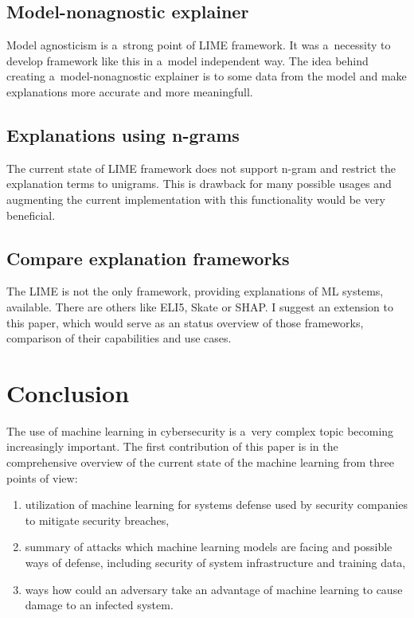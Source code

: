 \subsection{Model-nonagnostic explainer}\label{subsec:model-nonagnostic-explainer}

Model agnosticism is a~strong point of LIME framework.
It was a~necessity to develop framework like this in a~model independent way.
The idea behind creating a~model-nonagnostic explainer is to  some data from the model and make explanations more accurate and more meaningfull.

\subsection{Explanations using n-grams}\label{subsec:explanations-using-n-grams}

The current state of LIME framework does not support n-gram and restrict the explanation terms to unigrams.
This is drawback for many possible usages and augmenting the current implementation with this functionality would be very beneficial.

\subsection{Compare explanation frameworks}\label{subsec:compare-explanation-frameworks}

The LIME is not the only framework, providing explanations of ML systems, available.
There are others like ELI5, Skate or SHAP\@.
I suggest an extension to this paper, which would serve as an status overview of those frameworks, comparison of their capabilities and use cases.

\section{Conclusion}\label{sec:conclusion}

The use of machine learning in cybersecurity is a~very complex topic becoming increasingly important.
The first contribution of this paper is in the comprehensive overview of the current state of the machine learning from three points of view:

\begin{enumerate}
    \item utilization of machine learning for systems defense used by security companies to mitigate security breaches,
    \item summary of attacks which machine learning models are facing and possible ways of defense, including security of system infrastructure and training data,
    \item ways how could an adversary take an advantage of machine learning to cause damage to an infected system.
\end{enumerate}

